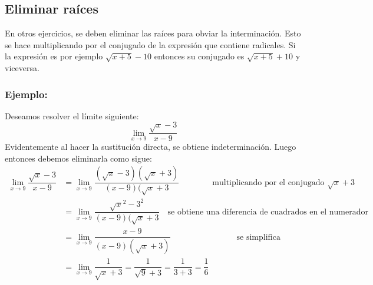 \documentclass[10pt,twoside]{article}
\begin{document}
\subsection*{Eliminar ra\'{i}ces}
En otros ejercicios, se deben eliminar las ra\'{i}ces para obviar la interminaci\'{o}n. Esto se hace multiplicando por el conjugado de la expresi\'{o}n que contiene radicales. Si la expresi\'{o}n es por ejemplo $\sqrt{x+5}-10$ entonces su conjugado es $\sqrt{x+5}+10$ y viceversa.
\subsubsection*{Ejemplo:}
Deseamos resolver el l\'{i}mite siguiente:
\[\displaystyle{\lim_{x\rightarrow 9}\dfrac{\sqrt{x}-3}{x-9}}\]
Evidentemente al hacer la sustituci\'{o}n directa, se obtiene indeterminaci\'{o}n. Luego entonces debemos eliminarla como sigue:
\begin{align*}
\displaystyle{\lim_{x\rightarrow 9}\dfrac{\sqrt{x}-3}{x-9}}&=\displaystyle{\lim_{x\rightarrow 9}\dfrac{(\sqrt{x}-3)(\sqrt{x}+3)}{(x-9)(\sqrt{x}+3}} \qquad  \qquad \mbox{multiplicando por el conjugado }\sqrt{x}+3\\
&=\displaystyle{\lim_{x\rightarrow 9}\dfrac{\sqrt{x}^{2}-3^{2}}{(x-9)(\sqrt{x}+3}} \quad \mbox{se obtiene una diferencia de cuadrados en el numerador}\\
&=\displaystyle{\lim_{x\rightarrow 9}\dfrac{x-9}{(x-9)(\sqrt{x}+3)}}\qquad \qquad  \qquad \qquad \mbox{se simplifica}\\
&=\displaystyle{\lim_{x\rightarrow 9}\dfrac{1}{\sqrt{x}+3}}=\dfrac{1}{\sqrt{9}+3}=\dfrac{1}{3+3}=\dfrac{1}{6}\\
\end{align*}
\end{document}
